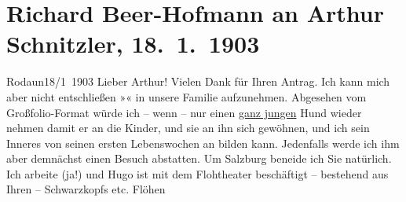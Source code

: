 

         
         \newcommand{\erwaehntePersonen}{Personen: Hugo von Hofmannsthal, Olga Schnitzler, Heinrich Schnitzler, Gustav Schwarzkopf}
         \newcommand{\erwaehnteInstitutionen}{Institutionen: Akademischer Verein für Kunst und Literatur}
         \newcommand{\erwaehnteOrte}{Orte: Hallein, Rodaun, Salzburg, Theater an der Wien, Wien}
         \newcommand{\erwaehnteWerke}{Werke: Elpenor. Trauerspiel}
               \section[Richard Beer-Hofmann an Arthur Schnitzler, 18. 1. 1903]{ Richard Beer-Hofmann an Arthur Schnitzler,
               18. 1. 1903}\nopagebreak{}\rehead{ }\begin{ledgroupsized}[t]{13cm}\normalsize\beginnumbering \toendnotes[C]{\smallbreak\pagebreak[2]} 
\toendnotes[C]{\smallbreak}\pstart
           \raggedleft{}{\pb}Rodaun18/1 1903\pend
           \pstart
           Lieber Arthur! Vielen Dank für Ihren Antrag. Ich kann mich aber
               nicht entschließen »\label{K_L01267_1v}\label{K_L01267_1h}« in unsere
               Familie aufzunehmen. Abgesehen vom Großfolio-Format würde ich – wenn – nur einen \uline{ganz jungen} Hund wieder nehmen damit er an die Kinder,
               und sie an ihn sich gewöhnen, und ich sein Inneres von seinen ersten Lebenswochen an
               bilden kann. Jedenfalls werde ich ihm aber demnächst einen Besuch abstatten. Um Salzburg beneide ich Sie na{\pb}türlich. Ich arbeite (ja!) und Hugo ist mit dem Flohtheater beschäftigt –
               bestehend aus Ihren – Schwarzkopfs etc. Flöhen

\end{ledgroupsized}
